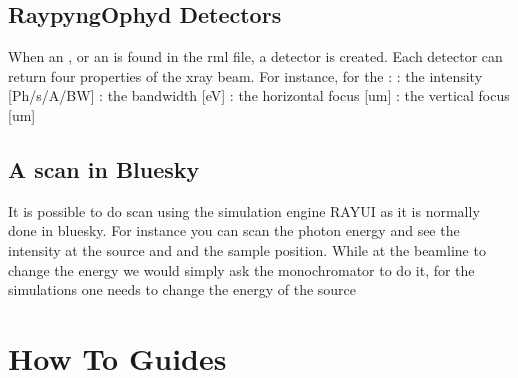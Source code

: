 \documentclass[letterpaper,10pt,english]{sphinxmanual}
\begin{document}
\section{RaypyngOphyd \sphinxhyphen{} Detectors}
\label{\detokenize{tutorial:raypyngophyd-detectors}}
\sphinxAtStartPar
When an , or an  is found in the rml file, a detector is created. Each detector
can return four properties of the x\sphinxhyphen{}ray beam. For instance, for the :
\sphinxhyphen{} : the intensity {[}Ph/s/A/BW{]}
\sphinxhyphen{} : the bandwidth  {[}eV{]}
\sphinxhyphen{} : the horizontal focus {[}um{]}
\sphinxhyphen{} : the vertical focus {[}um{]}


\section{A scan in Bluesky}
\label{\detokenize{tutorial:a-scan-in-bluesky}}
\sphinxAtStartPar
It is possible to do scan using the simulation engine RAY\sphinxhyphen{}UI as it is normally done in bluesky.
For instance you can scan the photon energy and see the intensity at the source and and the sample position.
While at the beamline to change the energy we would simply ask the monochromator to do it, for the simulations
one needs to change the energy of the source

\begin{sphinxVerbatim}[commandchars=\\\{\}]
\PYG{p}{[}\PYG{p}{]}    
\end{sphinxVerbatim}

\sphinxstepscope


\chapter{How To Guides}
\label{\detokenize{how_to:how-to-guides}}\label{\detokenize{how_to::doc}}
\end{document}

